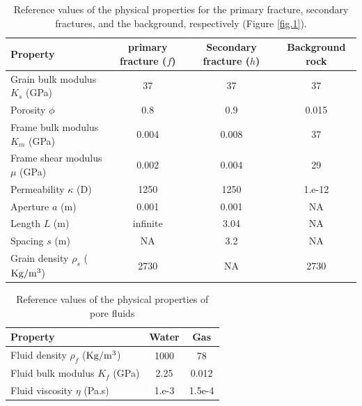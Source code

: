 \documentclass[draft]{agujournal2019}
\begin{document}
\begin{table}[!ht]
  \caption{Reference values of the physical properties for the primary fracture, secondary fractures, and the background, respectively (Figure \ref{fig.1}). }
\begin{center}
  \begin{tabular}{ | l c  c  c | }
    \hline
    Property & primary fracture ($f$) & Secondary fracture ($h$) & Background rock \\ \hline
    Grain bulk modulus $K_s$ (GPa) & 37 & 37 & 37 \\ 
    Porosity $\phi$ & 0.8 & 0.9 & 0.015 \\ 
    Frame bulk modulus $K_m$ (GPa) &  0.004 & 0.008 & 37\\ 
    Frame shear modulus $\mu$ (GPa) & 0.002 & 0.004 & 29\\
    Permeability $\kappa$ (D) & 1250 & 1250 & 1.e-12\\
    Aperture $a$ (m) & 0.001 & 0.001 & NA\\
    Length $L$ (m) & infinite & 3.04 & NA \\
    Spacing $s$ (m) & NA & 3.2
     & NA \\
    Grain density $\rho_s$ ($\rm{Kg/m^3}$) & 2730 & NA & 2730\\ 
    \hline
  \end{tabular}
  \label{table.1}
\end{center}
\end{table}

\begin{table}[!ht]
  \caption{Reference values of the physical properties of pore fluids}
\begin{center}
  \begin{tabular}{ | l  c  c |  }
    \hline
    Property & Water & Gas\\ \hline
    Fluid density $\rho_f$ ($\rm{Kg/m^3}$) & 1000 & 78\\
    Fluid bulk modulus $K_f$ (\rm{GPa}) & 2.25 & 0.012\\
    Fluid viscosity $\eta$ (\rm{Pa.s})& 1.e-3 & 1.5e-4\\
    \hline
  \end{tabular}
  \label{table.2}
\end{center}
\end{table}
\end{document}
